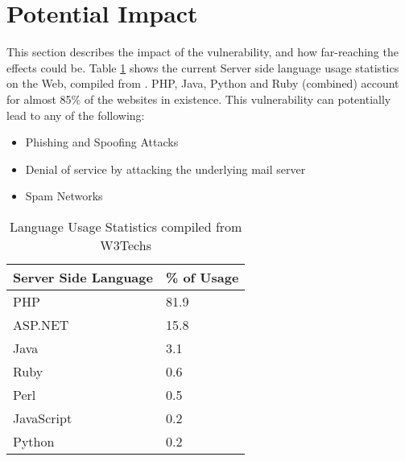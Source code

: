 \section{Potential Impact}

This section describes the impact of the vulnerability, and how far-reaching the effects could be. 
Table \ref{tab:usage} shows the current Server side language usage statistics on the Web, compiled from \cite{W3techs}. 
PHP, Java, Python and Ruby (combined) account for almost 85\% of the websites in existence. This vulnerability can potentially lead to any of the following:
\begin{itemize}
	\item Phishing and Spoofing Attacks
	\item Denial of service by attacking the underlying mail server
	\item Spam Networks

\end{itemize}
 

\begin{table}[!htbp]
	\centering
	\begin{tabular}{|p{4cm}|p{4cm}|}
		\hline
		Server Side Language & \% of Usage\\
		\hline
		PHP & 81.9\\
		\hline	
		ASP.NET	& 15.8\\
		\hline
		Java & 3.1\\
		\hline
		Ruby & 	0.6\\
		\hline
		Perl &	0.5\\
		\hline
		JavaScript & 0.2\\
		\hline
		Python & 0.2\\
		\hline
				
	\end{tabular}
	\caption{Language Usage Statistics compiled from W3Techs}
	\label{tab:usage}
\end{table}
